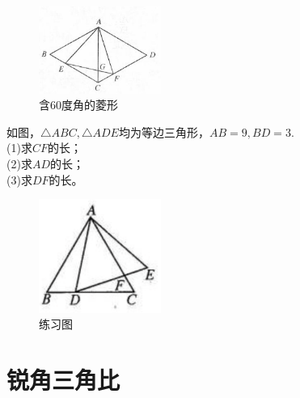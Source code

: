 \documentclass{ecnuthesis}
\begin{document}
\begin{figure}[H]
\centering
\includegraphics[width=4cm]{picture/608.png}
\caption{含60度角的菱形}
\end{figure}
\begin{problem}
    如图，$\triangle ABC,\triangle ADE$均为等边三角形，$AB=9,BD=3$. \\
    (1)求$CF$的长；\\
    (2)求$AD$的长；\\
    (3)求$DF$的长。\\
\end{problem}
\begin{figure}[H]
\centering
\includegraphics[width=4cm]{picture/839.png}
\caption{练习图}
\end{figure}
\clearpage
\chapter{锐角三角比}
\end{document}
